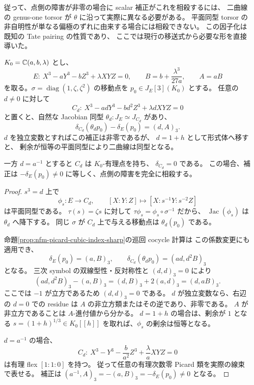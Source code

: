 従って、点側の障害が非零の場合に scalar 補正がこれを相殺するには、
二曲線の genus-one torsor が $\theta$ に沿って実際に異なる必要がある。
平面同型 torsor の非自明性が単なる偏極のずれに由来する場合には相殺できない。
この因子化は既知の Tate pairing の性質であり、
ここでは現行の移送式から必要な形を直接導いた。

\begin{proposition}[形式比較だけでは決まらない巡回補正]
\label{prop:nfm-cyclic-plane-twist}
$K_0=\mathbb C(a,b,\lambda)$ とし、
\[
 E:\ X^3-aY^3-bZ^3+\lambda XYZ=0,\qquad
 B=b+\frac{\lambda^3}{27a},\qquad A=aB
\]
を取る。$\sigma=\operatorname{diag}(1,\zeta,\zeta^2)$ の移動点を
$p_0\in J_E[3](K_0)$ とする。
任意の $d\ne0$ に対して
\[
 C_d:\ X^3-adY^3-bd^2Z^3+\lambda dXYZ=0
\]
と置くと、自然な Jacobian 同型
$\theta_d:J_E\simeq J_{C_d}$ があり、
\[
 \delta_{C_d}(\theta_d p_0)-\delta_E(p_0)
       =(d,A)_3.
\]
$d$ を独立変数とすればこの補正は非零であるが、
$d=1+h$ として形式体へ移すと、
剰余が恒等の平面同型により二曲線は同型となる。

一方 $d=a^{-1}$ とすると $C_d$ は $K_0$-有理点を持ち、
$\delta_{C_d}=0$ である。
この場合、補正は
$-\delta_E(p_0)\ne0$ に等しく、点側の障害を完全に相殺する。
\end{proposition}

\begin{proof}
$s^3=d$ 上で
\[
 \phi_s:E\longrightarrow C_d,\qquad
 [X:Y:Z]\longmapsto[X:s^{-1}Y:s^{-2}Z]
\]
は平面同型である。
$\tau(s)=\zeta s$ に対して $\tau\phi_s=\phi_s\circ\sigma^{-1}$ だから、
$\operatorname{Jac}(\phi_s)$ は $\theta_d$ へ降下する。
同じ $\sigma$ が $C_d$ 上で与える移動点は $\theta_d(p_0)$ である。

命題\ref{prop:nfm-picard-cubic-index-sharp}の巡回 cocycle 計算は
この係数変更にも適用でき、
\[
 \delta_E(p_0)=(a,B)_3,\qquad
 \delta_{C_d}(\theta_dp_0)=(ad,d^2B)_3
\]
となる。
三次 symbol の双線型性・反対称性と $(d,d)_3=0$ により
\[
 (ad,d^2B)_3-(a,B)_3
   =(d,B)_3+2(a,d)_3=(d,aB)_3.
\]
ここでは $-1$ が立方であるため $(d,d)_3=0$ である。
$d$ が独立変数なら、右辺の $d=0$ での residue は
$A$ の非立方類またはその逆であり、非零である。
$A$ が非立方であることは $A$-進付値から分かる。
$d=1+h$ の場合は、剰余が $1$ となる
$s=(1+h)^{1/3}\in K_0[[h]]$ を取れば、$\phi_s$ の剰余は恒等となる。

$d=a^{-1}$ の場合、
\[
 C_d:\ X^3-Y^3-\frac b{a^2}Z^3+\frac\lambda aXYZ=0
\]
は有理 flex $[1:1:0]$ を持つ。
従って任意の有理次数零 Picard 類を実際の線束で表せる。
補正は
$(a^{-1},A)_3=-(a,B)_3=-\delta_E(p_0)\ne0$ となる。
\end{proof}

